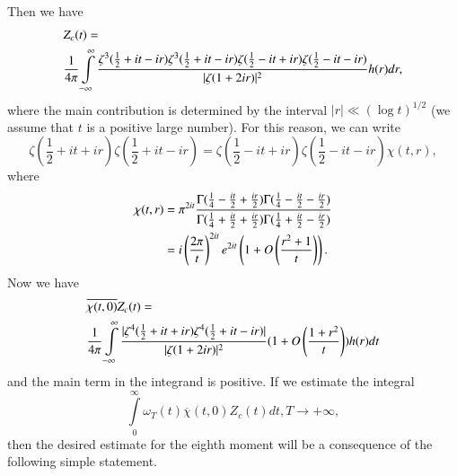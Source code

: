 Then we have 
\begin{align}
&Z_c (t) = \label{art7-eq5.6}\\
& \frac{1}{4\pi} \int\limits^\infty_{-\infty} \frac{\zeta^3 (\frac{1}{2} + it - ir) \zeta^3 (\frac{1}{2} + it- ir) \zeta(\frac{1}{2} - it + ir) \zeta (\frac{1}{2} - it - ir)}{|\zeta(1+2ir)|^2} h (r) dr, \notag
\end{align}
where the main contribution is determined by the interval $|r| \ll (\log t)^{1/2}$ (we assume that $t$ is a positive large number). For this reason, we can write 
\begin{equation}
\zeta(\frac{1}{2} + it + ir)  \zeta (\frac{1}{2} + it - ir) = \zeta(\frac{1}{2} - it + ir) \zeta (\frac{1}{2} - it - ir) \chi(t, r), \label{art7-eq5.7}
\end{equation}
where
\begin{align}
\chi(t,r) & = \pi^{2 it} \frac{\Gamma (\frac{1}{4} - \frac{it}{2} + \frac{ir}{2}) \Gamma (\frac{1}{4} - \frac{it}{2} - \frac{ir}{2})}{\Gamma (\frac{1}{4} + \frac{it}{2} + \frac{ir}{2}) \Gamma (\frac{1}{4} + \frac{it}{2} - \frac{ir}{2})}\label{art7-eq5.8}\\
&  = i \left(\frac{2\pi}{t} \right)^{2 it} e^{2 it} \left(1+ O \left(\frac{r^2+1}{t} \right) \right). \notag
\end{align}\pageoriginale
Now we have 
\begin{align} 
& \overline{\chi (t,0)} Z_c (t) = \label{art7-eq5.9}\\
& \frac{1}{4\pi} \int\limits^\infty_{-\infty} \frac{|\zeta^4 (\frac{1}{2} + it + ir) \zeta^4(\frac{1}{2} + it - ir )|}{|\zeta(1+2 ir)|^2} (1+O\left(\frac{1+r^2}{t} \right)) h (r) dt \notag
\end{align}
and the main term in the integrand is positive. If we estimate the integral 
\begin{equation}
\int\limits^\infty_0 \omega_T (t) \overline{\chi} (t, 0) Z_c (t) dt, T \to + \infty,  \label{art7-eq5.10}
\end{equation}
then the desired estimate for the eighth moment will be a consequence of the following simple statement.


